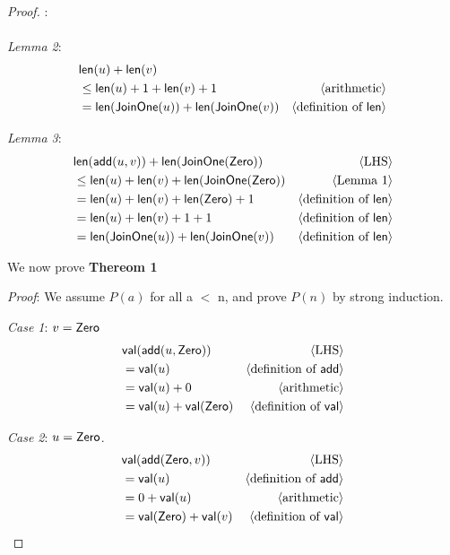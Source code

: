 \documentclass[11pt,fleqn]{article}
\newcommand{\mname}[1]{\mbox{\sf #1}}
\newcommand{\pnote}[1]{{\langle \text{#1} \rangle}}
\begin{document}
\begin{proof}:
\\\\
\emph{Lemma 2}:
\begin{align*}
  & \mname{len}(u) + \mname{len}(v)\\
  & \le \mname{len}(u) + 1 + \mname{len}(v) + 1 & \pnote{arithmetic}\\
  &= \mname{len}(\mname{JoinOne}(u)) + \mname{len}(\mname{JoinOne}(v)) & \pnote{definition of \mname{len}}\\
\end{align*}


\emph{Lemma 3}:
\begin{align*}
  & \mname{len}(\mname{add}(u,v)) + \mname{len}(\mname{JoinOne}(\mname{Zero}))  & \pnote{LHS}\\
  & \le \mname{len}(u) + \mname{len}(v) + \mname{len}(\mname{JoinOne}(\mname{Zero}))  & \pnote{Lemma 1}\\
  &= \mname{len}(u) + \mname{len}(v) +  \mname{len}(\mname{Zero}) + 1  & \pnote{definition of \mname{len}}\\
  &= \mname{len}(u) + \mname{len}(v) +1 + 1  & \pnote{definition of \mname{len}}\\
  &= \mname{len}(\mname{JoinOne}(u)) + \mname{len}(\mname{JoinOne}(v))  & \pnote{definition of \mname{len}}\\
\end{align*}

We now prove \textbf{Thereom 1}

\emph{Proof}: We assume $P(a)$ for all a $<$ n, and prove $P(n)$ by strong induction.

\emph{Case 1}: $v = \mname{Zero}$
\begin{align*}
  &\mname{val}(\mname{add}(u,\mname{Zero})) & \pnote{LHS}\\
  &= \mname{val}(u)  & \pnote{definition of \mname{add}}\\
  &= \mname{val}(u) + 0 & \pnote{arithmetic}\\
  &= \mname{val}(u) +  \mname{val}(\mname{Zero}) & \pnote{definition of \mname{val}}\\
\end{align*}


\emph{Case 2}: $u = \mname{Zero}$.
\begin{align*}
  &\mname{val}(\mname{add}(\mname{Zero},v)) & \pnote{LHS}\\
  &= \mname{val}(u)  & \pnote{definition of \mname{add}}\\
  &= 0 + \mname{val}(u)  & \pnote{arithmetic}\\
  &= \mname{val}(\mname{Zero}) +  \mname{val}(v) & \pnote{definition of \mname{val}}\\
\end{align*}



\end{proof}
\end{document}

